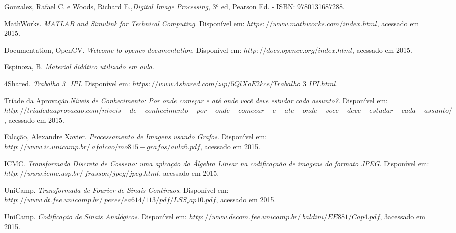 \documentclass[conference]{Trabalho_3}
\begin{document}
%
%
%
\begin{thebibliography}{1}

Gonzalez, Rafael C. e Woods, Richard E.,\emph{Digital Image Processing}, 3$^o$ ed,
Pearson Ed. - ISBN: 9780131687288. 

MathWorks. \emph{MATLAB and Simulink for Technical Computing}. Dispon\'ivel em: $https://www.mathworks.com/index.html$, acessado em 2015.

Documentation, OpenCV. \emph{Welcome to opencv documentation}. Dispon\'ivel em: $http://docs.opencv.org/index.html$, acessado em 2015.

Espinoza, B. \emph{Material did\'atico utilizado em aula}.

4Shared. \emph{Trabalho 3\_IPI}. Dispon\'ivel em:
$https://www.4shared.com/zip/5QlXoE2kce/Trabalho\_3\_IPI.html$.

Tr\'iade da Aprova\c{c}\~ao.\emph{N\'iveis de Conhecimento: Por onde come\c{c}ar e at\'e onde voc\^e deve estudar cada assunto?}. Dispon\'ivel em:
$http://triadedaaprovacao.com/niveis-de-conhecimento-por-onde-comecar-e-ate-onde-voce-deve-estudar-cada-assunto/$, acessado em 2015.

Falc\c{c}\~ao, Alexandre Xavier. \emph{Processamento de Imagens usando Grafos}. Dispon\'ivel em: $http://www.ic.unicamp.br/~afalcao/mo815-grafos/aula6.pdf$, acessado em 2015.

ICMC. \emph{Transformada Discreta de Cosseno: uma aplca\c{c}\~ao da \'Algebra Linear na codifica\c{c}a\~ao de imagens do formato JPEG}. Dispon\'ivel em: $http://www.icmc.usp.br/~frasson/jpeg/jpeg.html$, acessado em 2015.

UniCamp. \emph{Transformada de Fourier de Sinais Cont\'inuos}. Dispon\'ivel em: $http://www.dt.fee.unicamp.br/~peres/ea614/113/pdf/LSS_cap10.pdf$, acessado em 2015.

UniCamp. \emph{Codifica\c{c}\~ao de Sinais Anal\'ogicos}. Dispon\'ivel em: $http://www.decom.fee.unicamp.br/~baldini/EE881/Cap4.pdf$, 3acessado em 2015.
\end{thebibliography}

\end{document}

